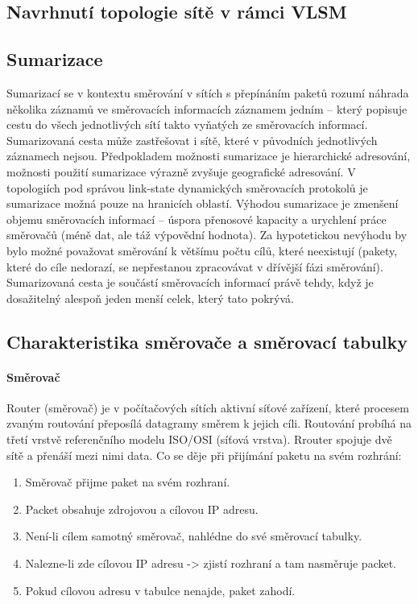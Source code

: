 \subsection{Navrhnutí topologie sítě v rámci VLSM}
\ToDo
\subsection{Sumarizace}
Sumarizací se v kontextu směrování v sítích s přepínáním paketů rozumí náhrada několika záznamů ve směrovacích informacích záznamem jedním – který popisuje cestu do všech jednotlivých sítí takto vyňatých ze směrovacích informací. Sumarizovaná cesta může zastřešovat i sítě, které v původních jednotlivých záznamech nejsou. Předpokladem možnosti sumarizace je hierarchické adresování, možnosti použití sumarizace výrazně zvyšuje geografické adresování. V topologiích pod správou link-state dynamických směrovacích protokolů je sumarizace možná pouze na hranicích oblastí. Výhodou sumarizace je zmenšení objemu směrovacích informací – úspora přenosové kapacity a urychlení práce směrovačů (méně dat, ale táž výpovědní hodnota). Za hypotetickou nevýhodu by bylo možné považovat směrování k většímu počtu cílů, které neexistují (pakety, které do cíle nedorazí, se nepřestanou zpracovávat v dřívější fázi směrování). Sumarizovaná cesta je součástí směrovacích informací právě tehdy, když je dosažitelný alespoň jeden menší celek, který tato pokrývá.


\subsection{Charakteristika směrovače a směrovací tabulky}
\paragraph{Směrovač}
Router (směrovač) je v počítačových sítích aktivní síťové zařízení, které procesem zvaným routování přeposílá datagramy směrem k jejich cíli. Routování probíhá na třetí vrstvě referenčního modelu ISO/OSI (síťová vrstva). Rrouter spojuje dvě sítě a přenáší mezi nimi data. Co se děje při přijímání paketu na svém rozhrání:
\begin{enumerate}
    \item Směrovač přijme paket na svém rozhraní.
    \item Packet obsahuje zdrojovou a cílovou IP adresu.
    \item Není-li cílem samotný směrovač, nahlédne do své směrovací tabulky.
    \item Nalezne-li zde cílovou IP adresu -> zjistí rozhraní a tam nasměruje packet.
    \item Pokud cílovou adresu v tabulce nenajde, paket zahodí.
\end{enumerate}

